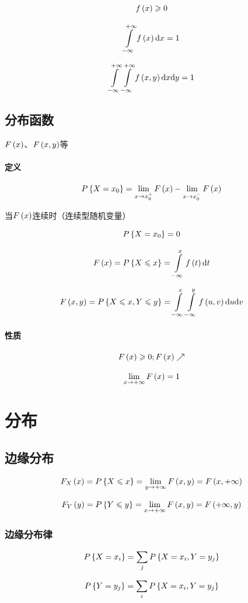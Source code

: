 \documentclass{article}
\begin{document}
\[f\left(x\right)\geqslant0\]

\[\int\limits_{-\infty}^{+\infty} f\left(x\right)\mathrm d x=1\]

\[\int\limits_{-\infty}^{+\infty}\int\limits_{-\infty}^{+\infty} f\left(x,y\right)\mathrm d x\mathrm d y=1\]

\subsection{分布函数}

$F\left(x\right)$、$F\left(x,y\right)$等

\paragraph{定义}

\[P\left\{X=x_0\right\}=\lim_{x\to x_0^+}F\left(x\right)-\lim_{x\to x_0^-}F\left(x\right)\]

当$F\left(x\right)$连续时（连续型随机变量）

\[P\left\{X=x_0\right\}=0\]

\[F\left(x\right)=P\left\{X\leqslant x\right\}=\int\limits_{-\infty}^xf\left(t\right)\mathrm d t\]

\[F\left(x,y\right)=P\left\{X\leqslant x,Y\leqslant y\right\}=\int\limits_{-\infty}^x\int\limits_{-\infty}^yf\left(u,v\right)\mathrm d u\mathrm d v\]

\paragraph{性质}

\[F\left(x\right)\geqslant0;F\left(x\right)\nearrow\]

\[\lim_{x\to+\infty}F\left(x\right)=1\]

\section{分布}

\subsection{边缘分布}

\[F_X\left(x\right)=P\left\{X\leqslant x\right\}=\lim_{y\to+\infty}F\left(x,y\right)=F\left(x,+\infty\right)\]

\[F_Y\left(y\right)=P\left\{Y\leqslant y\right\}=\lim_{x\to+\infty}F\left(x,y\right)=F\left(+\infty,y\right)\]

\subsubsection{边缘分布律}

\[P\left\{X=x_i\right\}=\sum_jP\left\{X=x_i,Y=y_j\right\}\]

\[P\left\{Y=y_j\right\}=\sum_iP\left\{X=x_i,Y=y_j\right\}\]
\end{document}
